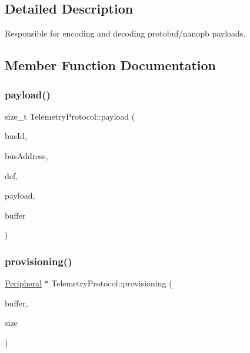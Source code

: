 \subsection{Detailed Description}
Responsible for encoding and decoding protobuf/nanopb payloads. 

\subsection{Member Function Documentation}
\mbox{\label{class_telemetry_protocol_a9b14fc6a3f0942bdc9d91e45604c082a}} 
\subsubsection{\texorpdfstring{payload()}{payload()}}
{\footnotesize\ttfamily size\+\_\+t Telemetry\+Protocol\+::payload (\begin{DoxyParamCaption}\item[{uint32\+\_\+t}]{bus\+Id,  }\item[{uint16\+\_\+t}]{bus\+Address,  }\item[{\mbox{\hyperlink{struct_read_definition}{Read\+Definition}} $\ast$}]{def,  }\item[{uint8\+\_\+t $\ast$}]{payload,  }\item[{uint8\+\_\+t $\ast$}]{buffer }\end{DoxyParamCaption})\hspace{0.3cm}{\ttfamily [static]}}

\mbox{\label{class_telemetry_protocol_a2425d455bed0b9b994c1de41b334fca5}} 
\subsubsection{\texorpdfstring{provisioning()}{provisioning()}}
{\footnotesize\ttfamily \mbox{\hyperlink{struct_peripheral}{Peripheral}} $\ast$ Telemetry\+Protocol\+::provisioning (\begin{DoxyParamCaption}\item[{uint8\+\_\+t $\ast$}]{buffer,  }\item[{unsigned int}]{size }\end{DoxyParamCaption})\hspace{0.3cm}{\ttfamily [static]}}

